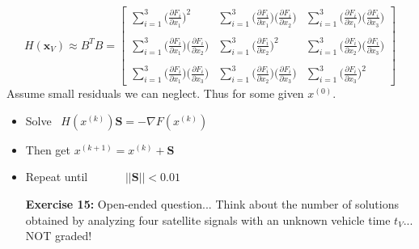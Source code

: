 \documentclass[11pt]{article}
\theoremstyle{definition}
\newcommand{\1}[1]{\mathbf{1} \left \{ #1 \right \}}
\begin{document}
\[H(\textbf{x}_V) \approx B^T B = \begin{bmatrix}
\sum_{i=1}^3\Big(\frac{\partial F_i}{\partial x_1}\Big)^2 & \sum_{i=1}^3\Big(\frac{\partial F_i}{\partial x_1}\Big)\Big(\frac{\partial F_i}{\partial x_2}\Big) & \sum_{i=1}^3\Big(\frac{\partial F_i}{\partial x_1}\Big)\Big(\frac{\partial F_i}{\partial x_3}\Big) \\ \\
\sum_{i=1}^3\Big(\frac{\partial F_i}{\partial x_1}\Big)\Big(\frac{\partial F_i}{\partial x_2}\Big) & \sum_{i=1}^3\Big(\frac{\partial F_i}{\partial x_2}\Big)^2 & \sum_{i=1}^3\Big(\frac{\partial F_i}{\partial x_2}\Big)\Big(\frac{\partial F_i}{\partial x_3}\Big) \\ \\
\sum_{i=1}^3\Big(\frac{\partial F_i}{\partial x_1}\Big)\Big(\frac{\partial F_i}{\partial x_3}\Big) & \sum_{i=1}^3\Big(\frac{\partial F_i}{\partial x_2}\Big)\Big(\frac{\partial F_i}{\partial x_3}\Big) & \sum_{i=1}^3\Big(\frac{\partial F_i}{\partial x_3}\Big)^2
\end{bmatrix}\]
Assume small residuals we can neglect.  Thus for some given $x^{(0)}$.
\begin{itemize}
    \item Solve \ \qquad \(H(x^{(k)})\textbf{S} = -\nabla F(x^{(k)})\)
    \item Then get \qquad \quad  \(x^{(k+1)} = x^{(k)} + \textbf{S}\)
    \item Repeat until \(\qquad \quad ||\textbf{S}|| < 0.01\)
\end{itemize}

\begin{itemize}
\item[{\textbf{Exercise 15:}}] Open-ended question... Think about the number of solutions obtained by analyzing four satellite signals with an unknown vehicle time $t_V$... NOT graded!
\end{itemize}
\end{document}

